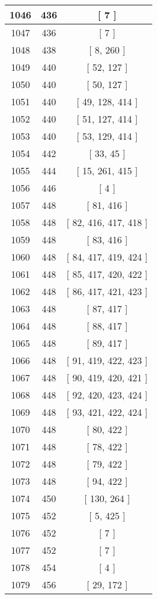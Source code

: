 \begin{center}
\begin{longtable}[H]{|| c c c ||}
\hline
1046 & 436 & [ 7 ] \\ 
\hline
1047 & 436 & [ 7 ] \\ 
\hline
1048 & 438 & [ 8, 260 ] \\ 
\hline
1049 & 440 & [ 52, 127 ] \\ 
\hline
1050 & 440 & [ 50, 127 ] \\ 
\hline
1051 & 440 & [ 49, 128, 414 ] \\ 
\hline
1052 & 440 & [ 51, 127, 414 ] \\ 
\hline
1053 & 440 & [ 53, 129, 414 ] \\ 
\hline
1054 & 442 & [ 33, 45 ] \\ 
\hline
1055 & 444 & [ 15, 261, 415 ] \\ 
\hline
1056 & 446 & [ 4 ] \\ 
\hline
1057 & 448 & [ 81, 416 ] \\ 
\hline
1058 & 448 & [ 82, 416, 417, 418 ] \\ 
\hline
1059 & 448 & [ 83, 416 ] \\ 
\hline
1060 & 448 & [ 84, 417, 419, 424 ] \\ 
\hline
1061 & 448 & [ 85, 417, 420, 422 ] \\ 
\hline
1062 & 448 & [ 86, 417, 421, 423 ] \\ 
\hline
1063 & 448 & [ 87, 417 ] \\ 
\hline
1064 & 448 & [ 88, 417 ] \\ 
\hline
1065 & 448 & [ 89, 417 ] \\ 
\hline
1066 & 448 & [ 91, 419, 422, 423 ] \\ 
\hline
1067 & 448 & [ 90, 419, 420, 421 ] \\ 
\hline
1068 & 448 & [ 92, 420, 423, 424 ] \\ 
\hline
1069 & 448 & [ 93, 421, 422, 424 ] \\ 
\hline
1070 & 448 & [ 80, 422 ] \\ 
\hline
1071 & 448 & [ 78, 422 ] \\ 
\hline
1072 & 448 & [ 79, 422 ] \\ 
\hline
1073 & 448 & [ 94, 422 ] \\ 
\hline
1074 & 450 & [ 130, 264 ] \\ 
\hline
1075 & 452 & [ 5, 425 ] \\ 
\hline
1076 & 452 & [ 7 ] \\ 
\hline
1077 & 452 & [ 7 ] \\ 
\hline
1078 & 454 & [ 4 ] \\ 
\hline
1079 & 456 & [ 29, 172 ] \\ 

\end{longtable}
\end{center}
